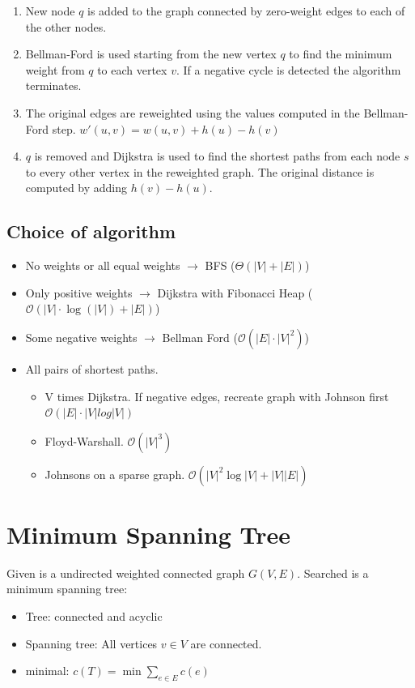 \documentclass[9pt,landscape,a4paper, table]{extarticle}
\begin{document}
\begin{multicols*}{3}
\begin{enumerate}
    \item New node $q$ is added to the graph connected by zero-weight edges to each of the other nodes. 
    \item Bellman-Ford is used starting from the new vertex $q$ to find the minimum weight from $q$ to each vertex $v$. If a negative cycle is detected the algorithm terminates. 
    \item The original edges are reweighted using the values computed in the Bellman-Ford step. $w'(u,v) = w(u,v) + h(u) - h(v)$
    \item $q$ is removed and Dijkstra is used to find the shortest paths from each node $s$ to every other vertex in the reweighted graph. The original distance is computed by adding $h(v)- h(u)$.
\end{enumerate}

\subsection{Choice of algorithm}
\begin{itemize}
	\item No weights or all equal weights $\rightarrow$ BFS ($\Theta(|V|+|E|)$)
	\item Only positive weights $\rightarrow$ Dijkstra with Fibonacci Heap ($\mathcal{O}(|V|\cdot \log(|V|) + |E|)$)
	\item Some negative weights $\rightarrow$ Bellman Ford ($\mathcal{O}(|E|\cdot|V|^2)$)
	\item All pairs of shortest paths.
	\begin{itemize}
	    \item V times Dijkstra. If negative edges, recreate graph with Johnson first $\mathcal{O}(|E| \cdot |V|  log |V| )$
	    \item Floyd-Warshall. $\mathcal{O}( |V|^3 )$
	    \item Johnsons on a sparse graph. $\mathcal{O}(|V|^{2}\log |V|+|V||E|)$
	\end{itemize} 
	
\end{itemize}

\section{Minimum Spanning Tree}
Given is a undirected weighted connected graph $G(V,E)$. Searched is a minimum spanning tree:
\begin{itemize}
    \item Tree: connected and acyclic
    \item Spanning tree: All vertices $v \in V$ are connected.
    \item minimal: $c(T) = \min \sum_{e \in E} c(e)$
\end{itemize}

\end{multicols*}
\end{document}
